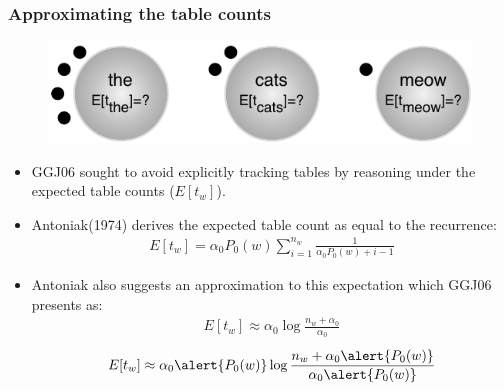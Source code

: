 \documentclass{beamer}
\begin{document}
\begin{frame}
\frametitle{Approximating the table counts}
\begin{figure}
\begin{center}
  \includegraphics[scale=0.7]{tables_expectation.pdf}
\end{center}
\end{figure}

\begin{itemize}
  \item GGJ06 sought to avoid explicitly tracking tables by reasoning under
the expected table counts ($E[t_w]$).

\item Antoniak(1974) derives the expected table count as equal to the recurrence:
\begin{align}
\nonumber E[t_w] = \alpha_0 P_0(w) \sum_{i=1}^{n_w} \frac{1}{\alpha_0 P_0(w) + i - 1}
\label{eqn:true_expected}
\end{align}
\item Antoniak also suggests an approximation to this expectation which GGJ06 
 presents as: 
 {
\begin{align}
  \nonumber E[t_w] \approx \alpha_0 \log \frac{n_w + \alpha_0}{\alpha_0}
\end{align}
}
 {
\begin{align}
  \nonumber E[t_w] \approx \alpha_0 \alert{P_0(w)} \log \frac{n_w + \alpha_0
  \alert{P_0(w)}}{\alpha_0 \alert{P_0(w)}}
\end{align}
\vspace{-0.32cm}
}
\end{itemize}
\end{frame}
\end{document}
